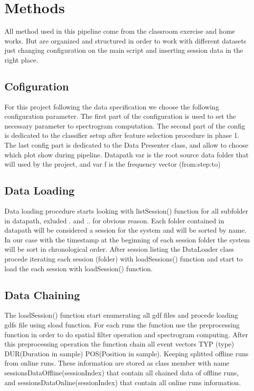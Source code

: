 \section{Methods}\label{sec:Methods} 
All method used in this pipeline come from the classroom exercise and home works. But are organized and structured in order to work with different datasets just changing configuration on the main script and inserting session data in the right place.
\subsection{Cofiguration}\label{subsec:configuration}
For this project following the data specification we choose the following configuration parameter. The first part of the configuration is used to set the necessary parameter to spectrogram computation. The second part of the config is dedicated to the classifier setup after feature selection procedure in phase 1. The last config part is dedicated to the Data Presenter class, and allow to choose which plot show during pipeline.
Datapath var is the root source data folder that will used by the project, and var f is the frequency vector (from:step:to)




\subsection{Data Loading}\label{subsec:loading}
Data loading procedure starts looking with listSession() function for all subfolder in datapath, exluded . and .. for obvious reason. Each folder contained in datapath will be considered a session for the system and will be sorted by name. In our case with the timestamp at the beginning of each session folder the system will be sort in chronological order. After session listing the DataLoader class procede iterating each session (folder) with loadSessions() function and start to load the each session with loadSession() function. 

\subsection{Data Chaining}\label{subsec:status}
The loadSession() function start enumerating all gdf files and procede loading gdfs file using sload function. For each runs the function use the preprocessing function in order to do spatial filter operation and spectrogram computing. After this preprocessing operation the function chain all event vectors TYP (type) DUR(Duration in sample) POS(Position in sample). Keeping splitted offline runs from online runs. These information are stored as class member with name sessionsDataOffline(sessionIndex) that contain all chained data of offline runs, and sessionsDataOnline(sessionIndex) that contain all online runs information.
